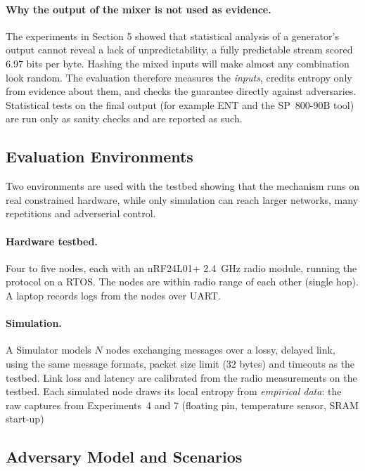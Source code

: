 \documentclass[a4paper, 12pt]{article}
\begin{document}
\paragraph{Why the output of the mixer is not used as evidence.} The experiments in Section 5 showed that statistical analysis of a generator's output cannot reveal a lack of unpredictability, a fully predictable stream scored 6.97 bits per byte. Hashing the mixed inputs will make almost any combination look random. The evaluation therefore measures the \emph{inputs}, credits entropy only from evidence about them, and checks the guarantee directly against adversaries. Statistical tests on the final output (for example ENT and the SP~800-90B tool) are run only as sanity checks and are reported as such.
 
\subsection{Evaluation Environments}
 
Two environments are used with the testbed showing that the mechanism runs on real constrained hardware, while only simulation can reach larger networks, many repetitions and adverserial control.
 
\paragraph{Hardware testbed.} Four to five nodes, each with an nRF24L01+ 2.4~GHz radio module, running the protocol on a RTOS. The nodes are within radio range of each other (single hop). A laptop records logs from the nodes over UART.
 
\paragraph{Simulation.} A Simulator models $N$ nodes exchanging messages over a lossy, delayed link, using the same message formats, packet size limit (32 bytes) and timeouts as the testbed. Link loss and latency are calibrated from the radio measurements on the testbed. Each simulated node draws its local entropy from \emph{empirical data}: the raw captures from Experiments~4 and 7 (floating pin, temperature sensor, SRAM start-up)
 
\subsection{Adversary Model and Scenarios}
 
\end{document}

